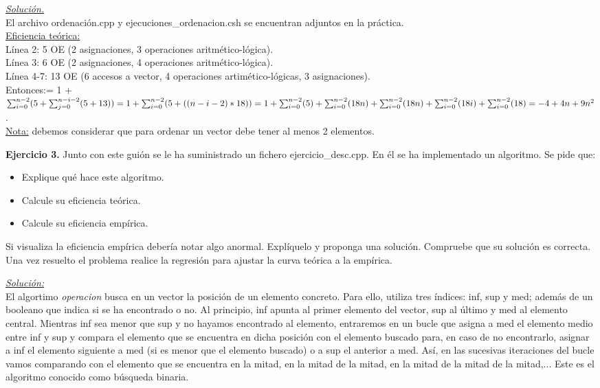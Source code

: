 \documentclass[titlepage, 12pt,a4paper]{article}
\begin{document}
\underline{\emph{Solución.}}\\
El archivo ordenación.cpp y ejecuciones\_ordenacion.csh se encuentran adjuntos en la práctica.\\

\underline{Eficiencia teórica:} \\
	Línea 2: 5 OE (2 asignaciones, 3 operaciones aritmético-lógica).\\
	Línea 3: 6 OE (2 asignaciones, 4 operaciones aritmético-lógica).\\
	Línea 4-7: 13 OE (6 accesos a vector, 4 operaciones artimético-lógicas, 3 asignaciones).\\

Entonces:= 1 + $\sum_{i=0}^{n-2}(5+\sum_{j=0}^{n-i-2}(5+13))= 1 + \sum_{i=0}^{n-2}(5+((n-i-2)*18))= \\
1 + \sum_{i=0}^{n-2}(5) + \sum_{i=0}^{n-2}(18n)+\sum_{i=0}^{n-2}(18n)+ \sum_{i=0}^{n-2}(18i) + \sum_{i=0}^{n-2}(18) = -4 + 4n + 9 n^2$.\\

\small{\underline{Nota:} debemos considerar que para ordenar un vector debe tener al menos 2 elementos.}

\newpage

\textbf{\large Ejercicio 3.} Junto con este guión se le ha suministrado un fichero ejercicio\_desc.cpp. En él se ha implementado un algoritmo. Se pide que:\\ 
	\begin{itemize}  
	\item  Explique qué hace este algoritmo.
	\item  Calcule su eficiencia teórica. 
	\item Calcule su eficiencia empírica.
	\end{itemize}
Si visualiza la eficiencia empírica debería notar algo anormal. Explíquelo y proponga una solución. Compruebe que su solución es correcta. Una vez resuelto el problema realice la regresión para ajustar la curva teórica a la empírica.
\vspace {1em}	

\underline{\emph{Solución:}}\\
El algortimo \textit{operacion} busca en un vector la posición de un elemento concreto. Para ello, utiliza tres índices: inf, sup y med; además de un booleano que indica si se ha encontrado o no. Al principio, inf apunta al primer elemento del vector, sup al último y med al elemento central. Mientras inf sea menor que sup y no hayamos encontrado al elemento, entraremos en un bucle que asigna a med el elemento medio entre inf y sup y compara el elemento que se encuentra en dicha posición con el elemento buscado para, en caso de no encontrarlo, asignar a inf el elemento siguiente a med (si es menor que el elemento buscado) o a sup el anterior a med. Así, en las sucesivas iteraciones del bucle vamos comparando con el elemento que se encuentra en la mitad, en la mitad de la mitad, en la mitad de la mitad de la mitad,... Este es el algoritmo conocido como búsqueda binaria.\vspace{1em}
\end{document}
